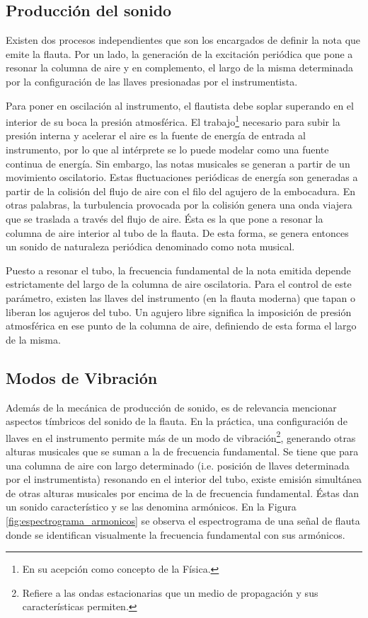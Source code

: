 \documentclass
  [ams,pdfout]%
	{aeslac}
\begin{document}
\subsection*{Producción del sonido}

Existen dos procesos independientes que son los encargados de definir la nota que emite la flauta. Por un lado, la generación de la excitación periódica que pone a resonar la columna de aire y en complemento, el largo de la misma determinada por la configuración de las llaves presionadas por el instrumentista. 

Para poner en oscilación al instrumento, el flautista debe soplar superando en el interior de su boca la presión atmosférica. El trabajo\footnote{En su acepción como concepto de la Física.} necesario para subir la presión interna y acelerar el aire es la fuente de energía de entrada al instrumento, por lo que al intérprete se lo puede modelar como una fuente continua de energía. Sin embargo, las notas musicales se generan a partir de un movimiento oscilatorio. Estas fluctuaciones periódicas de energía son generadas a partir de la colisión del flujo de aire con el filo del agujero de la embocadura. En otras palabras, la turbulencia provocada por la colisión genera una onda viajera que se traslada a través del flujo de aire. Ésta es la que pone a resonar la columna de aire interior al tubo de la flauta. De esta forma, se genera entonces un sonido de naturaleza periódica denominado como nota musical.

Puesto a resonar el tubo, la frecuencia fundamental de la nota emitida depende estrictamente del largo de la columna de aire oscilatoria. Para el control de este parámetro, existen las llaves del instrumento (en la flauta moderna) que tapan o liberan los agujeros del tubo. Un agujero libre significa la imposición de presión atmosférica en ese punto de la columna de aire, definiendo de esta forma el largo de la misma.


\subsection*{Modos de Vibración}

Además de la mecánica de producción de sonido, es de relevancia mencionar aspectos tímbricos del sonido de la flauta. En la práctica, una configuración de llaves en el instrumento permite más de un modo de vibración\footnote{Refiere a las ondas estacionarias que un medio de propagación y sus características permiten.}, generando otras alturas musicales que se suman a la de frecuencia fundamental. Se tiene que para una columna de aire con largo determinado (i.e. posición de llaves determinada por el instrumentista) resonando en el interior del tubo, existe emisión simultánea de otras alturas musicales por encima de la de frecuencia fundamental. Éstas dan un sonido característico y se las denomina armónicos. En la Figura \ref{fig:espectrograma_armonicos} se observa el espectrograma de una señal de flauta donde se identifican visualmente la frecuencia fundamental con sus armónicos.
\end{document}
